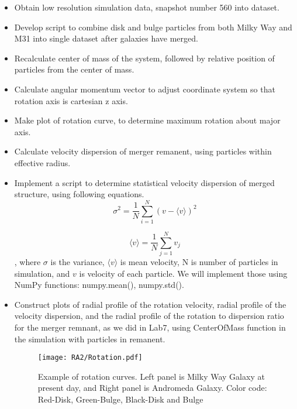 \documentclass[twocolumn, trackchanges]{aastex7}
\begin{document}
\begin{itemize}
    \item Obtain low resolution simulation data, snapshot number 560 into dataset.    
    \item  Develop script to combine disk and bulge particles from both Milky Way and M31 into single dataset after galaxies have merged. 
    \item Recalculate center of mass of the system, followed by relative position of particles from the center of mass. 
    \item Calculate angular momentum vector to adjust coordinate system so that rotation axis is cartesian z axis. 
    \item Make plot of rotation curve, to determine maximum rotation about major axis.
    \item Calculate velocity dispersion of merger remanent, using particles within effective radius. 
    \item Implement a script to determine statistical velocity dispersion of merged structure, using following equations.
        \begin{equation}
            \sigma ^2 = \frac{1}{N} \sum_{i=1}^{N} (v- \langle v \rangle)^2 
        \end{equation}
        
        \begin{equation}
            \langle v \rangle = \frac{1}{N}  \sum_{j=1}^{N} v_j
        \end{equation}
    , where $\sigma $ is the variance, $\langle v \rangle $ is mean velocity, N is number of particles in simulation, and $v$ is velocity of each particle. We will implement those using NumPy functions: numpy.mean(), numpy.std().
    \item Construct plots of radial profile of the rotation velocity, radial profile of the velocity dispersion, and the radial profile of the rotation to dispersion ratio for the merger remnant, as we did in Lab7, using CenterOfMass function in the simulation with particles in remanent.
\begin{figure}[h]
  \centering
  \texttt{[image: RA2/Rotation.pdf]}
  \caption{Example of rotation curves. Left panel is Milky Way Galaxy at present day, and Right panel is Andromeda Galaxy. Color code: Red-Disk, Green-Bulge, Black-Disk and Bulge}
  \label{fig:lab7example}
\end{figure}

\end{itemize}
\end{document}
